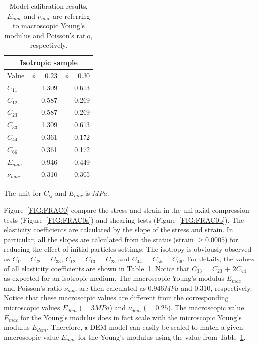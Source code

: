 \documentclass[review,authoryear]{elsarticle}
\begin{document}
\begin{table}
\centering
\caption{Model calibration results. $E_{mac}$ and $\nu_{mac}$ are referring to macroscopic Young's modulus and Poisson's ratio, respectively. }
\begin{threeparttable}[b]
\begin{tabular} {lrr}
\hline\hline 
 \multicolumn{3}{c}{Isotropic sample} \\
 \hline
Value\tnote{1} & $\phi=0.23$ & $\phi=0.30$ \\
\hline
$C_{11}$ 		& 1.309 & 0.613 \\
$C_{12}$ 		& 0.587 & 0.269 \\
$C_{23}$ 		& 0.587 & 0.269 \\
$C_{33}$ 		& 1.309 & 0.613 \\
$C_{44}$ 		& 0.361 & 0.172 \\
$C_{66}$ 		& 0.361 & 0.172 \\
$E_{mac}$  	    & 0.946 & 0.449 \\
$\nu_{mac}$  	& 0.310 & 0.305 \\
\hline    
\bottomrule
\end{tabular}\label{TABLE:ISOTROPIC}
\begin{tablenotes}
      \small
      \item [1] The unit for $C_{ij}$ and $E_{mac}$ is $MPa$.
	\end{tablenotes}
\end{threeparttable}
\end{table}

Figure~\ref{FIG:FRAC0} compare the stress and strain in the uni-axial compression tests (Figure~\ref{FIG:FRAC0a}) and shearing tests (Figure~\ref{FIG:FRAC0b}).
The elasticity coefficients are calculated by the slope of the stress and strain. In particular, all the slopes are calculated from the status (strain $\geq 0.0005$) for reducing the effect of initial particles settings. 
The isotropy is obviously observed as $C_{11}$= $C_{22}$ = $C_{33}$, $C_{12}$ = $C_{13}$ = $C_{23}$ and $C_{44}$ = $C_{55}$ = $C_{66}$. For details, the values of all elasticity coefficients are shown in Table~\ref{TABLE:ISOTROPIC}. Notice that $C_{33}$ = $C_{23}$ + $2C_{44}$ as expected for an isotropic medium. The macroscopic Young's modulus $E_{mac}$ and Poisson's ratio $\nu_{mac}$ are then calculated as $0.946 MPa$ and $0.310$, respectively. Notice that these macroscopic values are different from the corresponding microscopic values $E_{dem}$ ($=3 MPa$) and $\nu_{dem}$ ($=0.25$). The macroscopic value $E_{mac}$ for the Young's modulus does in fact scale with the microscopic Young's modulus $E_{dem}$. Therefore, a DEM model can easily be scaled to match a given macroscopic value $E_{mac}$ for the Young's modulus using the value from Table~\ref{TABLE:ISOTROPIC}.
\end{document}
